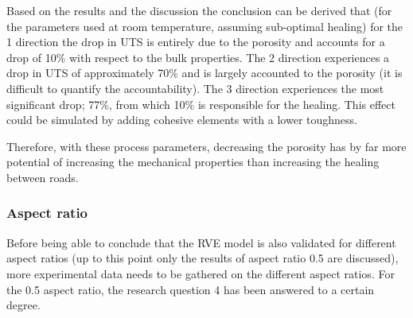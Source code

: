 Based on the results and the discussion the conclusion can be derived that (for the parameters used at room temperature, assuming sub-optimal healing) for the 1 direction the drop in UTS is entirely due to the porosity and accounts for a drop of 10\% with respect to the bulk properties. The 2 direction experiences a drop in UTS of approximately 70\% and is largely accounted to the porosity (it is difficult to quantify the accountability). The 3 direction experiences the most significant drop; 77\%, from which 10\% is responsible for the healing. This effect could be simulated by adding cohesive elements with a lower toughness.

Therefore, with these process parameters, decreasing the porosity has by far more potential of increasing the mechanical properties than increasing the healing between roads. 
\subsubsection{Aspect ratio}
Before being able to conclude that the RVE model is also validated for different aspect ratios (up to this point only the results of aspect ratio 0.5 are discussed), more experimental data needs to be gathered on the different aspect ratios. For the 0.5 aspect ratio, the research question 4 has been answered to a certain degree. 

